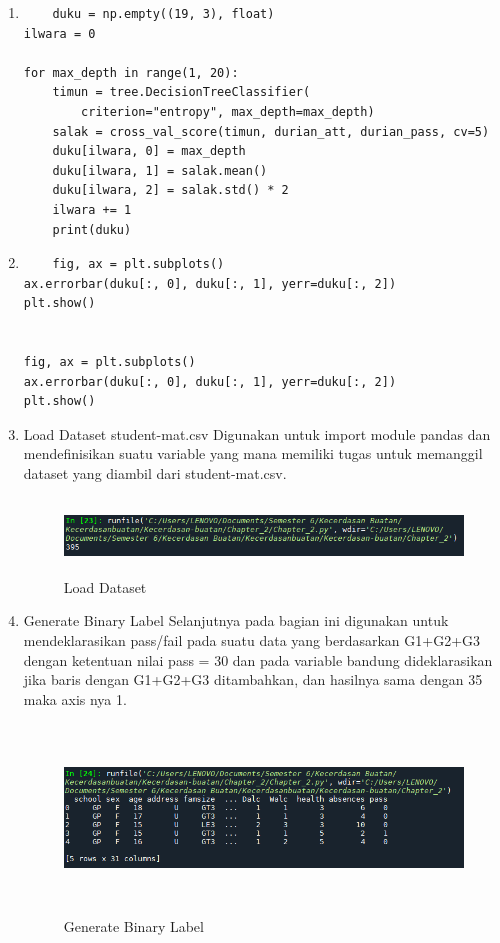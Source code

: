 \begin{enumerate}
\item
\begin{verbatim}
	duku = np.empty((19, 3), float)
ilwara = 0

for max_depth in range(1, 20):
    timun = tree.DecisionTreeClassifier(
        criterion="entropy", max_depth=max_depth)
    salak = cross_val_score(timun, durian_att, durian_pass, cv=5)
    duku[ilwara, 0] = max_depth
    duku[ilwara, 1] = salak.mean()
    duku[ilwara, 2] = salak.std() * 2
    ilwara += 1
	print(duku)
\end{verbatim}


\item 
\begin{verbatim}
	fig, ax = plt.subplots()
ax.errorbar(duku[:, 0], duku[:, 1], yerr=duku[:, 2])
plt.show()


fig, ax = plt.subplots()
ax.errorbar(duku[:, 0], duku[:, 1], yerr=duku[:, 2])
plt.show()
\end{verbatim}



\item Load Dataset student-mat.csv
\newline Digunakan untuk import module pandas dan mendefinisikan suatu variable yang mana memiliki tugas untuk memanggil dataset yang diambil dari student-mat.csv.
\begin{figure}[!htbp]
	\centering
	\includegraphics[width=11cm,height=2cm]{figures/Cp2-a.png}
	\caption{Load Dataset}
	\label{penanda}
\end{figure}

\item Generate Binary Label
\newline Selanjutnya pada bagian ini digunakan untuk mendeklarasikan pass/fail pada suatu data yang berdasarkan G1+G2+G3 dengan ketentuan nilai pass = 30 dan pada variable bandung dideklarasikan jika baris dengan G1+G2+G3 ditambahkan, dan hasilnya sama dengan 35 maka axis nya 1.
\begin{figure}[!htbp]
	\centering
	\includegraphics[width=13cm,height=5cm]{figures/Cp2-b.png}
	\caption{Generate Binary Label}
	\label{penanda}
\end{figure}


\end{enumerate}
